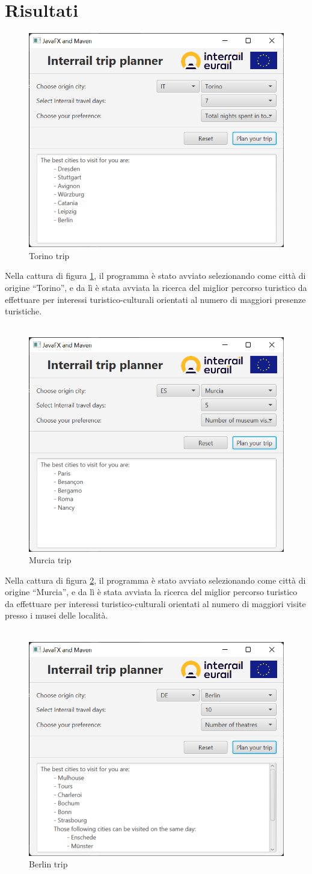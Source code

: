 \documentclass[12pt, a4paper]{article}
\begin{document}
	\section{Risultati}
	\begin{figure}[h]
		\centering
		\includegraphics[width=0.5\linewidth]{torino-tur}
		\caption{Torino trip}
		\label{torino-tur}
	\end{figure}
 Nella cattura di figura \ref{torino-tur}, il programma è stato avviato selezionando come città di origine “Torino”, e da lì è stata avviata la ricerca del miglior percorso turistico da effettuare per interessi turistico-culturali orientati al numero di maggiori presenze turistiche.\\\\
	\begin{figure}[h]
		\centering
		\includegraphics[width=0.5\linewidth]{murcia-mus}
		\caption{Murcia trip}
		\label{murcia-mus}
	\end{figure}
 Nella cattura di figura \ref{murcia-mus}, il programma è stato avviato selezionando come città di origine “Murcia”, e da lì è stata avviata la ricerca del miglior percorso turistico da effettuare per interessi turistico-culturali orientati al numero di maggiori visite presso i musei delle località.\\\\
	\begin{figure}[h]
		\centering
		\includegraphics[width=0.5\linewidth]{berlin-the}
		\caption{Berlin trip}
		\label{berlin-the}
	\end{figure}
\end{document}
